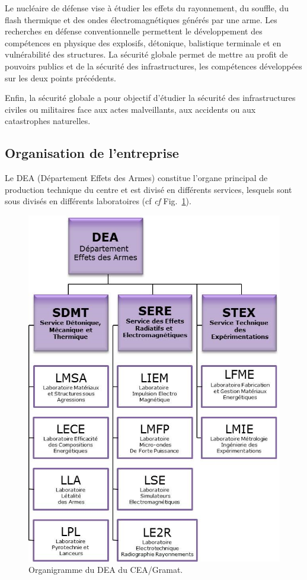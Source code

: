 Le nucléaire de défense vise à étudier les effets du rayonnement, du souffle, du flash thermique et des ondes électromagnétiques générés par une arme.
Les recherches en défense conventionnelle permettent le développement des compétences en physique des explosifs, détonique, balistique terminale et en vulnérabilité des structures. La sécurité globale permet de mettre au profit de pouvoirs publics et de la sécurité des infrastructures, les compétences développées sur les deux points précédents. 

Enfin, la sécurité globale a pour objectif d’étudier la sécurité des infrastructures civiles ou militaires face aux actes malveillants, aux accidents ou aux catastrophes naturelles.

\subsection{Organisation de l'entreprise}

Le DEA (Département Effets des Armes) constitue l'organe principal de production technique du centre et est divisé en différents services, lesquels sont sous divisés en différents laboratoires (cf \textit{cf} Fig.~\ref{orga}). 

\begin{figure}[h]
\centering
\includegraphics[scale=0.6]{fichier_configuration/organigramme.png} 
\caption{Organigramme du DEA du CEA/Gramat.}
\label{orga}
\end{figure}

